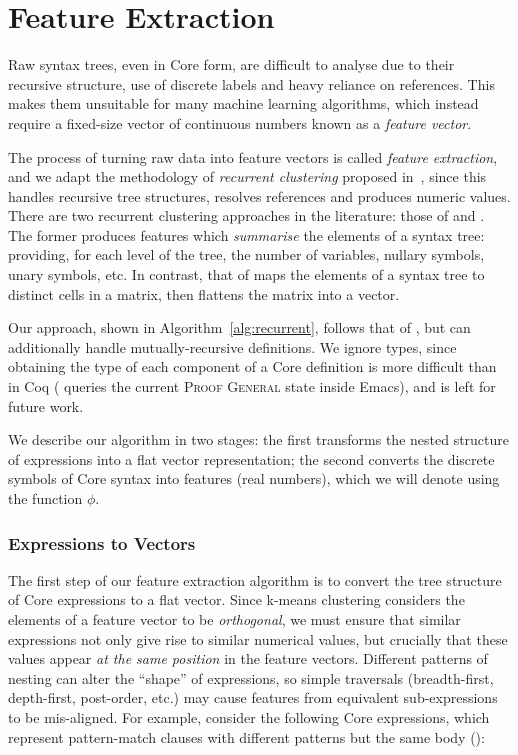 \section{Feature Extraction}
\label{sec:featureextraction}

Raw syntax trees, even in Core form, are difficult to analyse due to their
recursive structure, use of discrete labels and heavy reliance on references.
This makes them unsuitable for many machine learning algorithms, which instead
require a fixed-size vector of continuous numbers known as a
\emph{feature vector}.

The process of turning raw data into feature vectors is called \emph{feature
  extraction}, and we adapt the methodology of \emph{recurrent clustering}
proposed in~\cite{DBLP:journals/corr/HerasK14,heras2013proof}, since this
handles recursive tree structures, resolves references and produces numeric
values. There are two recurrent clustering approaches in the literature: those
of \mlforpg{} and \aclml{}. The former produces features which \emph{summarise}
the elements of a syntax tree: providing, for each level of the tree, the number
of variables, nullary symbols, unary symbols, etc. In contrast, that of
\mlforpg{} maps the elements of a syntax tree to distinct cells in a matrix,
then flattens the matrix into a vector.

Our approach, shown in Algorithm~\ref{alg:recurrent}, follows that of
\mlforpg{}, but can additionally handle mutually-recursive definitions. We
ignore types, since obtaining the type of each component of a Core definition is
more difficult than in Coq (\mlforpg{} queries the current
\textsc{Proof General} state inside Emacs), and is left for future work.

We describe our algorithm in two stages: the first transforms the nested
structure of expressions into a flat vector representation; the second converts
the discrete symbols of Core syntax into features (real numbers), which we will
denote using the function $\phi$.

\subsubsection{Expressions to Vectors}
\label{sec:expressionstovectors}

The first step of our feature extraction algorithm is to convert the tree
structure of Core expressions to a flat vector. Since k-means clustering
considers the elements of a feature vector to be \emph{orthogonal}, we must
ensure that similar expressions not only give rise to similar numerical values,
but crucially that these values appear \emph{at the same position} in the
feature vectors. Different patterns of nesting can alter the ``shape'' of
expressions, so simple traversals (breadth-first, depth-first, post-order, etc.)
may cause features from equivalent sub-expressions to be mis-aligned. For
example, consider the following Core expressions, which represent pattern-match
clauses with different patterns but the same body ():

